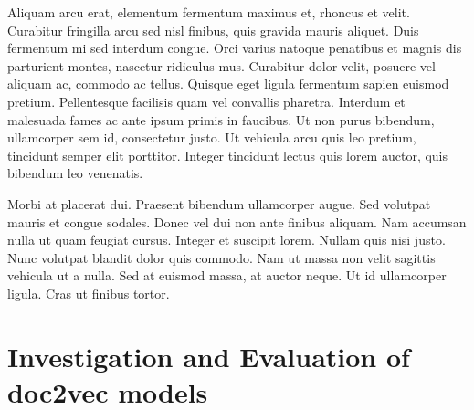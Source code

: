 \documentclass[twocolumn]{article}
\begin{document}
Aliquam arcu erat, elementum fermentum maximus et, rhoncus et velit. Curabitur fringilla arcu sed nisl finibus, quis gravida mauris aliquet. Duis fermentum mi sed interdum congue. Orci varius natoque penatibus et magnis dis parturient montes, nascetur ridiculus mus. Curabitur dolor velit, posuere vel aliquam ac, commodo ac tellus. Quisque eget ligula fermentum sapien euismod pretium. Pellentesque facilisis quam vel convallis pharetra. Interdum et malesuada fames ac ante ipsum primis in faucibus. Ut non purus bibendum, ullamcorper sem id, consectetur justo. Ut vehicula arcu quis leo pretium, tincidunt semper elit porttitor. Integer tincidunt lectus quis lorem auctor, quis bibendum leo venenatis.

Morbi at placerat dui. Praesent bibendum ullamcorper augue. Sed volutpat mauris et congue sodales. Donec vel dui non ante finibus aliquam. Nam accumsan nulla ut quam feugiat cursus. Integer et suscipit lorem. Nullam quis nisi justo. Nunc volutpat blandit dolor quis commodo. Nam ut massa non velit sagittis vehicula ut a nulla. Sed at euismod massa, at auctor neque. Ut id ullamcorper ligula. Cras ut finibus tortor.

\section{Investigation and Evaluation of doc2vec models}

\end{document}
